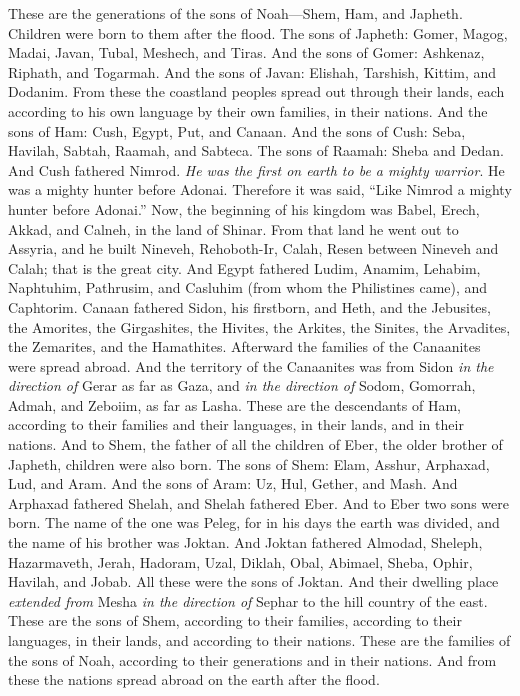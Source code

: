 \begin{biblechapter} %
 These are the generations of the sons of Noah—Shem, Ham, and Japheth. Children were born to them after the flood.
\verse The sons of Japheth: Gomer, Magog, Madai, Javan, Tubal, Meshech, and Tiras.
\verse And the sons of Gomer: Ashkenaz, Riphath, and Togarmah.
\verse And the sons of Javan: Elishah, Tarshish, Kittim, and Dodanim.
\verse From these the coastland peoples spread out through their lands, each according to his own language by their own families, in their nations.
\verse And the sons of Ham: Cush, Egypt, Put, and Canaan.
\verse And the sons of Cush: Seba, Havilah, Sabtah, Raamah, and Sabteca. The sons of Raamah: Sheba and Dedan.
\verse And Cush fathered Nimrod. \textit{He was the first on earth to be a mighty warrior}.
\verse He was a mighty hunter before Adonai. Therefore it was said, “Like Nimrod a mighty hunter before Adonai.”
\verse Now, the beginning of his kingdom was Babel, Erech, Akkad, and Calneh, in the land of Shinar.
\verse From that land he went out to Assyria, and he built Nineveh, Rehoboth-Ir, Calah,
\verse Resen between Nineveh and Calah; that is the great city.
\verse And Egypt fathered Ludim, Anamim, Lehabim, Naphtuhim,
\verse Pathrusim, and Casluhim (from whom the Philistines came), and Caphtorim.
\verse Canaan fathered Sidon, his firstborn, and Heth,
\verse and the Jebusites, the Amorites, the Girgashites,
\verse the Hivites, the Arkites, the Sinites,
\verse the Arvadites, the Zemarites, and the Hamathites. Afterward the families of the Canaanites were spread abroad.
\verse And the territory of the Canaanites was from Sidon \textit{in the direction of} Gerar as far as Gaza, and \textit{in the direction of} Sodom, Gomorrah, Admah, and Zeboiim, as far as Lasha.
\verse These are the descendants of Ham, according to their families and their languages, in their lands, and in their nations.
\verse And to Shem, the father of all the children of Eber, the older brother of Japheth, children were also born.
\verse The sons of Shem: Elam, Asshur, Arphaxad, Lud, and Aram.
\verse And the sons of Aram: Uz, Hul, Gether, and Mash.
\verse And Arphaxad fathered Shelah, and Shelah fathered Eber.
\verse And to Eber two sons were born. The name of the one was Peleg, for in his days the earth was divided, and the name of his brother was Joktan.
\verse And Joktan fathered Almodad, Sheleph, Hazarmaveth, Jerah,
\verse Hadoram, Uzal, Diklah,
\verse Obal, Abimael, Sheba,
\verse Ophir, Havilah, and Jobab. All these were the sons of Joktan.
\verse And their dwelling place \textit{extended from} Mesha \textit{in the direction of} Sephar to the hill country of the east.
\verse These are the sons of Shem, according to their families, according to their languages, in their lands, and according to their nations.
\verse These are the families of the sons of Noah, according to their generations and in their nations. And from these the nations spread abroad on the earth after the flood.
\end{biblechapter}

